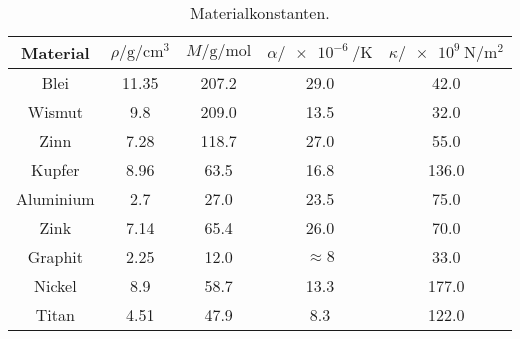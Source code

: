 \begin{table}
    \centering
    \caption{Materialkonstanten.}
    \label{tab:const}
    \begin{tabular}{c S[table-format=2.1(0)e0] S[table-format=3.2(0)e0] c S[table-format=3.2(0)e0] }
        \toprule
        {Material} & {$ρ/\si{\gram\per\cm\cubed}$} & {$M/\si{\gram\per\mol}$} & {$α/\SI{e-6}{\per\kelvin}$} & {$κ/\SI{e9}{\newton\per\meter\squared}$} \\
        \midrule
        {Blei} & 11.35 & 207.2 & 29.0  & 42.0  \\
        {Wismut} & 9.8   & 209.0 & 13.5  & 32.0  \\
        {Zinn} & 7.28  & 118.7 & 27.0  & 55.0  \\
        {Kupfer} & 8.96  & 63.5  & 16.8  & 136.0     \\
        {Aluminium} & 2.7   & 27.0  & 23.5  & 75.0  \\
        {Zink} & 7.14  & 65.4  & 26.0  & 70.0  \\
        {Graphit} & 2.25  & 12.0  & {$\approx 8$}   & 33.0  \\
        {Nickel} & 8.9   & 58.7  & 13.3  & 177.0     \\
        {Titan} & 4.51  & 47.9  & 8.3   & 122.0     \\
        \bottomrule
    \end{tabular}
\end{table}
